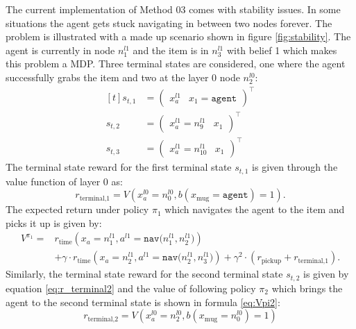 The current implementation of Method 03 comes with stability issues. In some situations the agent gets stuck navigating in between two nodes forever. The problem is illustrated with a made up scenario shown in figure \ref{fig:stability}. The agent is currently in node $n_1^{l1}$ and the item is in $n_3^{l1}$ with belief 1 which makes this problem a MDP. Three terminal states are considered, one where the agent successfully  grabs the item and two at the layer 0 node $n_2^{l0}$:
\begin{equation}
    \begin{aligned}[t]
        s_{t,1} &= \begin{pmatrix}x_a^{l1} & x_1=\texttt{agent}\end{pmatrix}^\intercal \\
        s_{t,2} &= \begin{pmatrix}x_a^{l1}=n_9^{l1} & x_1\end{pmatrix}^\intercal\\
        s_{t,3} &= \begin{pmatrix}x_a^{l1}=n_{10}^{l1} & x_1\end{pmatrix}^\intercal
    \end{aligned}
\end{equation}
%
The terminal state reward for the first terminal state $s_{t,1}$ is given through the value function of layer 0 as:
\begin{equation}
    r_{\text{terminal,}1} = V\left(x_a^{l0}=n_0^{l0}, b(x_\text{mug}=\texttt{agent})=1\right).    
\end{equation}
The expected return under policy $\pi_1$ which navigates the agent to the item and picks it up is given by:
%
\begin{equation}
    \begin{aligned}
        V^{\pi_1} = &r_\text{time}(x_a=n_1^{l1}, a^{l1}=\texttt{nav($n_1^{l1}, n_2^{l1}$)})\\ 
        &+ \gamma\cdot r_\text{time}(x_a=n_2^{l1}, a^{l1}=\texttt{nav($n_2^{l1}, n_3^{l1}$)}) + \gamma^2 \cdot (r_\text{pickup} + r_{\text{terminal,}1}).
    \end{aligned}
\end{equation}
Similarly, the terminal state reward for the second terminal state $s_{t,2}$ is given by equation \ref{eq:r_terminal2} and the value of following policy $\pi_2$ which brings the agent to the second terminal state is shown in formula \ref{eq:Vpi2}:
\begin{equation}\label{eq:r_terminal2}
    r_{\text{terminal,}2} = V\left( x_a^{l0}=n_2^{l0}, b(x_\text{mug}=n_0^{l0})=1 \right)
\end{equation}
